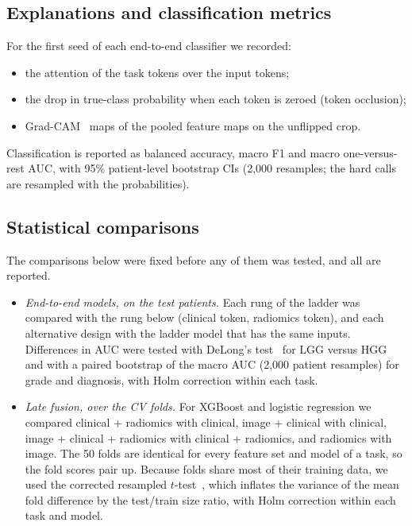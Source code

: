 \documentclass[11pt]{article}
\begin{document}
\subsection{Explanations and classification metrics}
For the first seed of each end-to-end classifier we recorded:
\begin{itemize}
  \item the attention of the task tokens over the input tokens;
  \item the drop in true-class probability when each token is zeroed (token occlusion);
  \item Grad-CAM~\cite{selvaraju2017gradcam} maps of the pooled feature maps on the unflipped crop.
\end{itemize}
Classification is reported as balanced accuracy, macro F1 and macro one-versus-rest AUC, with 95\% patient-level
bootstrap CIs (2,000 resamples; the hard calls are resampled with the probabilities).

\subsection{Statistical comparisons}
\label{sec:stats}
The comparisons below were fixed before any of them was tested, and all are reported.
\begin{itemize}
  \item \emph{End-to-end models, on the test patients.} Each rung of the ladder was compared with the rung below
        (clinical token, radiomics token), and each alternative design with the ladder model that has the same
        inputs. Differences in AUC were tested with DeLong's test~\cite{delong1988} for LGG versus HGG and with a
        paired bootstrap of the macro AUC (2,000 patient resamples) for grade and diagnosis, with Holm correction
        within each task.
  \item \emph{Late fusion, over the CV folds.} For XGBoost and logistic regression we compared clinical + radiomics
        with clinical, image + clinical with clinical, image + clinical + radiomics with clinical + radiomics, and
        radiomics with image. The 50 folds are identical for every feature set and model of a task, so the fold
        scores pair up. Because folds share most of their training data, we used the corrected resampled
        $t$-test~\cite{nadeau2003inference,bouckaert2004replicability}, which inflates the variance of the mean
        fold difference by the test/train size ratio, with Holm correction within each task and model.
\end{itemize}
\end{document}
